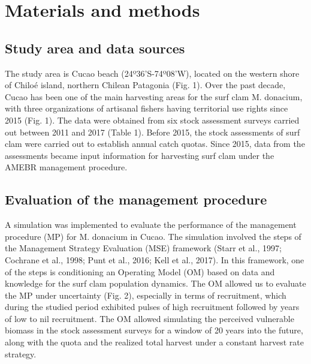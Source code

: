 \documentclass[]{article}
\author{}
\date{\vspace{-2.5em}}
\begin{document}
\hypertarget{materials-and-methods}{%
\section{Materials and methods}\label{materials-and-methods}}

\hypertarget{study-area-and-data-sources}{%
\subsection{Study area and data
sources}\label{study-area-and-data-sources}}

The study area is Cucao beach (24º36'S-74º08'W), located on the western
shore of Chiloé island, northern Chilean Patagonia (Fig. 1). Over the
past decade, Cucao has been one of the main harvesting areas for the
surf clam M. donacium, with three organizations of artisanal fishers
having territorial use rights since 2015 (Fig. 1). The data were
obtained from six stock assessment surveys carried out between 2011 and
2017 (Table 1). Before 2015, the stock assessments of surf clam were
carried out to establish annual catch quotas. Since 2015, data from the
assessments became input information for harvesting surf clam under the
AMEBR management procedure.

\hypertarget{evaluation-of-the-management-procedure}{%
\subsection{Evaluation of the management
procedure}\label{evaluation-of-the-management-procedure}}

A simulation was implemented to evaluate the performance of the
management procedure (MP) for M. donacium in Cucao. The simulation
involved the steps of the Management Strategy Evaluation (MSE) framework
(Starr et al., 1997; Cochrane et al., 1998; Punt et al., 2016; Kell et
al., 2017). In this framework, one of the steps is conditioning an
Operating Model (OM) based on data and knowledge for the surf clam
population dynamics. The OM allowed us to evaluate the MP under
uncertainty (Fig. 2), especially in terms of recruitment, which during
the studied period exhibited pulses of high recruitment followed by
years of low to nil recruitment. The OM allowed simulating the perceived
vulnerable biomass in the stock assessment surveys for a window of 20
years into the future, along with the quota and the realized total
harvest under a constant harvest rate strategy.
\end{document}
